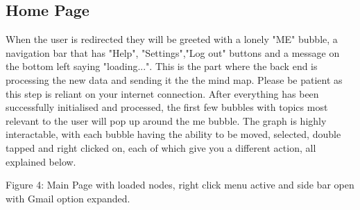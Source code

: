\documentclass[hidelinks,english]{article}
\begin{document}
	\subsection{Home Page}
	When the user is redirected they will be greeted with a lonely "ME" bubble, a navigation bar that has "Help", "Settings","Log out" buttons and a message on the bottom left saying "loading...". This is the part where the back end is processing the new data and sending it the the mind map. Please be patient as this step is reliant on your internet connection. After everything has been successfully initialised and processed, the first few bubbles with topics most relevant to the user will pop up around the me bubble. The graph is highly interactable, with each bubble having the ability to be moved, selected, double tapped and right clicked on, each of which give you a different action, all explained below. 
    \begin{center}
	  \caption{Figure 4: Main Page with loaded nodes, right click menu active and side bar open with Gmail option expanded.}
	  \label{Main page}
	\end{center}
\end{document}
